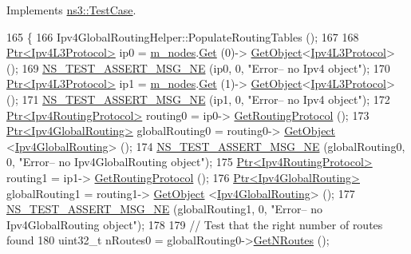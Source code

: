 Implements \hyperlink{classns3_1_1TestCase_a8ff74680cf017ed42011e4be51917a24}{ns3\+::\+Test\+Case}.


\begin{DoxyCode}
165 \{
166   Ipv4GlobalRoutingHelper::PopulateRoutingTables ();
167 
168   \hyperlink{classns3_1_1Ptr}{Ptr<Ipv4L3Protocol>} ip0 = \hyperlink{classLinkTest_a5a290d414e995ec402de538a24976387}{m\_nodes}.\hyperlink{classns3_1_1NodeContainer_a9ed96e2ecc22e0f5a3d4842eb9bf90bf}{Get} (0)->
      \hyperlink{classns3_1_1Object_a13e18c00017096c8381eb651d5bd0783}{GetObject}<\hyperlink{classns3_1_1Ipv4L3Protocol}{Ipv4L3Protocol}> ();
169   \hyperlink{group__testing_ga73d66fb0050a5111453fd144e767b91a}{NS\_TEST\_ASSERT\_MSG\_NE} (ip0, 0, \textcolor{stringliteral}{"Error-- no Ipv4 object"});  
170   \hyperlink{classns3_1_1Ptr}{Ptr<Ipv4L3Protocol>} ip1 = \hyperlink{classLinkTest_a5a290d414e995ec402de538a24976387}{m\_nodes}.\hyperlink{classns3_1_1NodeContainer_a9ed96e2ecc22e0f5a3d4842eb9bf90bf}{Get} (1)->
      \hyperlink{classns3_1_1Object_a13e18c00017096c8381eb651d5bd0783}{GetObject}<\hyperlink{classns3_1_1Ipv4L3Protocol}{Ipv4L3Protocol}> ();
171   \hyperlink{group__testing_ga73d66fb0050a5111453fd144e767b91a}{NS\_TEST\_ASSERT\_MSG\_NE} (ip1, 0, \textcolor{stringliteral}{"Error-- no Ipv4 object"});  
172   \hyperlink{classns3_1_1Ptr}{Ptr<Ipv4RoutingProtocol>} routing0 = ip0->
      \hyperlink{classns3_1_1Ipv4L3Protocol_aa1e4efbf4978299e47406895c3f4b41d}{GetRoutingProtocol} ();
173   \hyperlink{classns3_1_1Ptr}{Ptr<Ipv4GlobalRouting>} globalRouting0 = routing0->
      \hyperlink{classns3_1_1Object_a13e18c00017096c8381eb651d5bd0783}{GetObject} <\hyperlink{classns3_1_1Ipv4GlobalRouting}{Ipv4GlobalRouting}> ();
174   \hyperlink{group__testing_ga73d66fb0050a5111453fd144e767b91a}{NS\_TEST\_ASSERT\_MSG\_NE} (globalRouting0, 0, \textcolor{stringliteral}{"Error-- no Ipv4GlobalRouting object"});  
175   \hyperlink{classns3_1_1Ptr}{Ptr<Ipv4RoutingProtocol>} routing1 = ip1->
      \hyperlink{classns3_1_1Ipv4L3Protocol_aa1e4efbf4978299e47406895c3f4b41d}{GetRoutingProtocol} ();
176   \hyperlink{classns3_1_1Ptr}{Ptr<Ipv4GlobalRouting>} globalRouting1 = routing1->
      \hyperlink{classns3_1_1Object_a13e18c00017096c8381eb651d5bd0783}{GetObject} <\hyperlink{classns3_1_1Ipv4GlobalRouting}{Ipv4GlobalRouting}> ();
177   \hyperlink{group__testing_ga73d66fb0050a5111453fd144e767b91a}{NS\_TEST\_ASSERT\_MSG\_NE} (globalRouting1, 0, \textcolor{stringliteral}{"Error-- no Ipv4GlobalRouting object"});  
178 
179   \textcolor{comment}{// Test that the right number of routes found}
180   uint32\_t nRoutes0 = globalRouting0->\hyperlink{classns3_1_1Ipv4GlobalRouting_abb9d2b3642272b9bd2697a5699922fa7}{GetNRoutes} ();

\end{DoxyCode}
